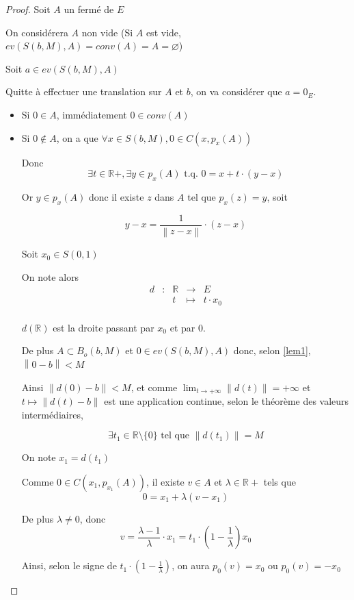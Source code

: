 \documentclass[a4paper]{article}
\newcommand{\norm}[1]{\left\lVert#1\right\rVert}
\begin{document}
    \begin{proof}
    Soit $A$ un fermé de $E$

    On considérera $A$ non vide (Si $A$ est vide, $ev(S(b, M), A) = conv(A) = A = \varnothing$)

    Soit $a \in ev(S(b, M), A)$

    Quitte à effectuer une translation sur $A$ et $b$, on va considérer que $a = 0_{E}$.

    \begin{itemize}
    \item Si $0 \in A$, immédiatement $0 \in conv(A)$
    \bigskip
    \item Si $0 \notin A$, on a que $\forall x \in S(b, M), 0 \in C(x, p_{x}(A))$

    Donc \[\exists t \in \mathbb{R}+, \exists y\in p_{x}(A) \text{ t.q. } 0 = x + t \cdot (y - x)\]

    Or $y \in p_{x}(A)$ donc il existe $z$ dans $A$ tel que $p_{x}(z) = y$, soit

    \[y - x = \frac{1}{\norm{z - x}} \cdot (z - x)\]


    Soit $x_{0} \in S(0, 1)$

    On note alors
    \[\begin{array}{ccccl}
    d& : & \mathbb{R} & \to & E \\
     & & t & \mapsto & t \cdot x_{0} \\
    \end{array}\]

    $d(\mathbb{R})$ est la droite passant par $x_{0}$  et par $0$.

    De plus $A \subset B_{o}(b, M)$ et $0 \in ev(S(b, M), A)$ donc, selon \ref{lem1}, $\norm{0 - b} < M$

    Ainsi $\norm{d(0) - b} < M$, et comme $\lim_{t \to +\infty}\norm{d(t)} = +\infty$ et $t \mapsto \norm{d(t) - b}$ est une application continue, selon le théorème des valeurs intermédiaires,

    \[\exists t_{1} \in \mathbb{R}\setminus\{0\} \text{ tel que } \norm{d(t_{1})} = M\]

    On note $x_{1} = d(t_{1})$

    Comme $0 \in C(x_{1}, p_{x_{1}}(A))$, il existe $v \in A$ et $\lambda \in \mathbb{R}+$ tels que \[0 = x_{1} + \lambda (v - x_{1})\]

    De plus $\lambda \neq 0$, donc \[v = \frac{\lambda - 1}{\lambda} \cdot x_{1} = t_{1} \cdot (1 - \frac{1}{\lambda}) x_{0}\]

    Ainsi, selon le signe de $t_{1} \cdot (1 - \frac{1}{\lambda})$, on aura $p_{0}(v) = x_{0}$ ou $p_{0}(v) = - x_{0}$


\end{itemize}
\end{proof}
\end{document}
